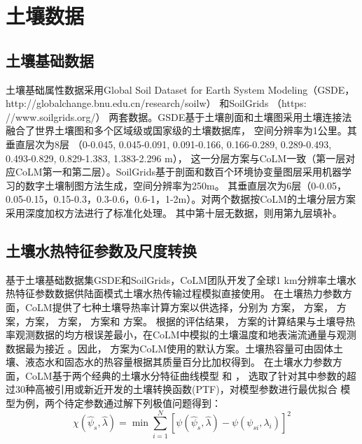 \section{土壤数据}\label{土壤数据}
\subsection{土壤基础数据}\label{土壤基础数据}
土壤基础属性数据采用Global Soil Dataset for Earth System Modeling（GSDE，http://globalchange.bnu.edu.cn/research/soilw） \citep{shangguan2014global}
和SoilGrids （https:\\//www.soilgrids.org/）\citep{poggio2021soilgrids} 两套数据。GSDE基于土壤剖面和土壤图采用土壤连接法融合了世界土壤图和多个区域级或国家级的土壤数据库，
空间分辨率为1公里。其垂直层次为8层 （0-0.045, 0.045-0.091, 0.091-0.166, 0.166-0.289, 0.289-0.493, 0.493-0.829, 0.829-1.383, 1.383-2.296 m），
这一分层方案与CoLM一致（第一层对应CoLM第一和第二层）。SoilGrids基于剖面和数百个环境协变量图层采用机器学习的数字土壤制图方法生成，空间分辨率为250m。
其垂直层次为6层（0-0.05，0.05-0.15，0.15-0.3，0.3-0.6，0.6-1，1-2m）。对两个数据按CoLM的土壤分层方案采用深度加权方法进行了标准化处理。
其中第十层无数据，则用第九层填补。

\subsection{土壤水热特征参数及尺度转换}\label{土壤水热特征参数及尺度转换}

基于土壤基础数据集GSDE和SoilGrids，CoLM团队开发了全球1 km分辨率土壤水热特征参数数据供陆面模式土壤水热传输过程模拟直接使用。
在土壤热力参数方面，CoLM提供了七种土壤导热率计算方案以供选择，分别为 \citet{farouki1981thermal}方案，\citet{Johansen1975} 方案，
\citet{cote2005} 方案，\citet{balland2005}方案，\citet{lu2007improved} 方案，\citet{tarnawski2012series} 方案和 \citet{de1963thermal} 方案。
根据\citet{dai2019evaluation}的评估结果，\citet{balland2005} 方案的计算结果与土壤导热率观测数据的均方根误差最小，在CoLM中模拟的土壤温度和地表湍流通量与观测数据最为接近
。因此，\citet{balland2005} 方案为CoLM使用的默认方案。土壤热容量可由固体土壤、液态水和固态水的热容量根据其质量百分比加权得到。
在土壤水力参数方面，CoLM基于两个经典的土壤水分特征曲线模型 \citet{campbell1974} 和 \citet{van1980closed}，
选取了针对其中参数的超过30种高被引用或新近开发的土壤转换函数(PTF)，对模型参数进行最优拟合 \citet{balland2005,campbell1974} 模型为例，两个待定参数通过解下列极值问题得到：
\begin{equation}
\chi\left(\hat{\psi}_{s}, \hat{\lambda}\right)=\min \sum_{i=1}^{N}\left[\psi\left(\hat{\psi}_{s}, \hat{\lambda}\right)-\psi\left(\psi_{s i}, \lambda_{i}\right)\right]^{2}
\end{equation}

